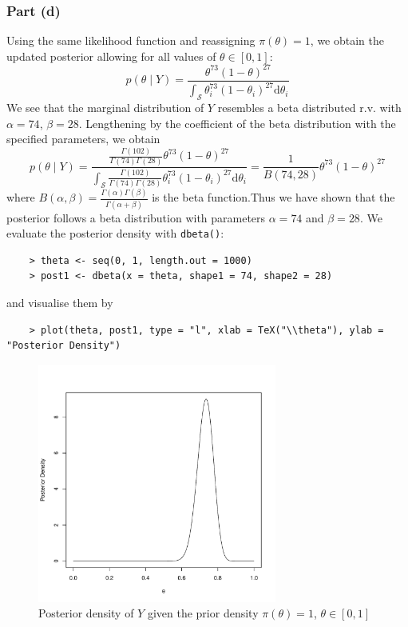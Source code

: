 \documentclass{report}
\begin{document}
\subsubsection*{Part (d)}
Using the same likelihood function and reassigning $\pi(\theta) = 1$, we obtain the updated posterior allowing for all values of $\theta \in [0, 1]$:
\[
p(\theta \mid Y) = \frac{\theta^{73} (1 - \theta)^{27}}{\int_{\mathcal S} \theta_i^{73}(1 - \theta_i)^{27} \mathrm{d}\theta_i}
\]
We see that the marginal distribution of $Y$ resembles a beta distributed r.v. with $\alpha = 74$, $\beta = 28$. Lengthening by the coefficient of the beta distribution with the specified parameters, we obtain
\[
p(\theta \mid Y) = \frac{\frac{\Gamma(102)}{\Gamma(74)\Gamma(28)}\theta^{73}(1 - \theta)^{27}}{\int_{\mathcal S}\frac{\Gamma(102)}{\Gamma(74)\Gamma(28)} \theta_i^{73} (1 - \theta_i)^{27} \mathrm{d}\theta_i} = \frac{1}{B(74, 28)} \theta^{73} (1 - \theta)^{27}
\]
where $B(\alpha, \beta) = \frac{\Gamma(\alpha)\Gamma(\beta)}{\Gamma(\alpha + \beta)}$ is the beta function.\@ Thus we have shown that the posterior follows a beta distribution with parameters $\alpha = 74$ and $\beta = 28$. We evaluate the posterior density with \texttt{dbeta()}:
\begin{verbatim}
    > theta <- seq(0, 1, length.out = 1000)
    > post1 <- dbeta(x = theta, shape1 = 74, shape2 = 28)
\end{verbatim}
and visualise them by
\begin{verbatim}
    > plot(theta, post1, type = "l", xlab = TeX("\\theta"), ylab = "Posterior Density")
\end{verbatim}
\vspace*{-1cm}
\begin{figure}[H]
    \centering
    \includegraphics[width=0.7\textwidth]{binom_plot_posterior_uniform.pdf}
    \caption{Posterior density of $Y$ given the prior density $\pi(\theta) = 1$, $\theta \in [0, 1]$}
    \label{fig:binom_posterior_uniform}
\end{figure}
\end{document}
